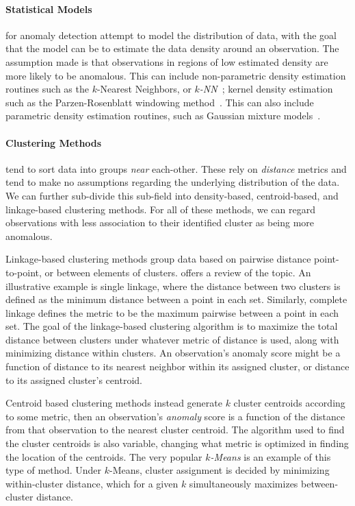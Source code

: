 \paragraph{Statistical Models} for anomaly detection attempt to model the distribution of
    data, with the goal that the model can be to estimate the data density around an observation.
    The assumption made is that observations in regions of low estimated density are more likely to be
    anomalous.  This can include non-parametric density estimation routines such as the $k$-Nearest
    Neighbors, or \emph{$k$-NN}~\citep{kramer2013}; kernel density estimation such as the Parzen-Rosenblatt
    windowing method~\citep{parzen1962,rosenblatt1956}.  This can also include parametric density estimation
    routines, such as Gaussian mixture models~\citep{mcnicholas2010}.

\paragraph{Clustering Methods} tend to sort data into groups \emph{near} each-other.  These rely on
    \emph{distance} metrics and tend to make no assumptions regarding the underlying distribution of the 
    data.  We can further sub-divide this sub-field into density-based, centroid-based, and linkage-based
    clustering methods.  For all of these methods, we can regard observations with less association to 
    their identified cluster as being more anomalous.

Linkage-based clustering methods group data based on pairwise distance point-to-point, or between
    elements of clusters.  \cite{ackerman2010} offers a review of the topic.  An illustrative example
    is single linkage, where the distance between two clusters is defined as the minimum distance between
    a point in each set.   Similarly, complete linkage defines the metric to be the maximum pairwise
    between a point in each set.  The goal of the linkage-based clustering algorithm is to maximize the
    total distance between clusters under whatever metric of distance is used, along with minimizing
    distance within clusters.  An observation's anomaly score might be a function of distance to its nearest
    neighbor within its assigned cluster, or distance to its assigned cluster's centroid.

Centroid based clustering methods instead generate $k$ cluster centroids according to some metric,
    then an observation's \emph{anomaly} score is a function of the distance from that
    observation to the nearest cluster centroid.  The algorithm used to find the cluster
    centroids is also variable, changing what metric is optimized in finding the location of the
    centroids.  The very popular \emph{$k$-Means} \citep{hartigan1979} is an example of this type of
    method.  Under $k$-Means, cluster assignment is decided by minimizing within-cluster distance,
    which for a given $k$ simultaneously maximizes between-cluster distance.

